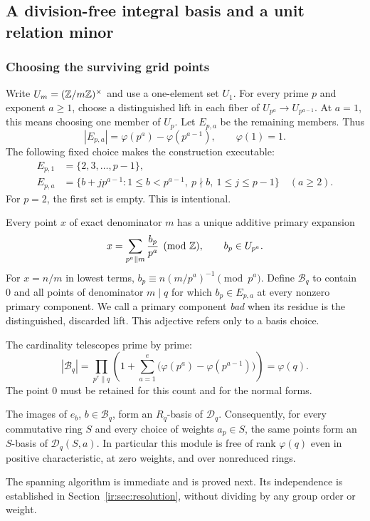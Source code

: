 \subsection{A division-free integral basis and a unit relation minor}
\label{ir:sec:integral}

\subsubsection{Choosing the surviving grid points}
Write $U_m=(\mathbb{Z}/m\mathbb{Z})^\times$ and use a one-element set $U_1$.
For every prime $p$ and exponent $a\ge1$, choose a distinguished lift
in each fiber of $U_{p^a}\to U_{p^{a-1}}$. At $a=1$, this means choosing
one member of $U_p$. Let $E_{p,a}$ be the remaining members. Thus
\begin{equation}\label{ir:eq:local-count}
 |E_{p,a}|=\varphi(p^a)-\varphi(p^{a-1}),\qquad \varphi(1)=1.
\end{equation}
The following fixed choice makes the construction executable:
\begin{align}
 E_{p,1}&=\{2,3,\ldots,p-1\},\label{ir:eq:local-choice}\\
 E_{p,a}&=\{b+jp^{a-1}:1\le b<p^{a-1},\ p\nmid b,
                         \ 1\le j\le p-1\}\quad(a\ge2).\nonumber
\end{align}
For $p=2$, the first set is empty. This is intentional.

Every point $x$ of exact denominator $m$ has a unique additive primary
expansion
\begin{equation}\label{ir:eq:primary-coordinates}
 x=\sum_{p^a\parallel m}\frac{b_p}{p^a}\pmod{\mathbb{Z}},
 \qquad b_p\in U_{p^a}.
\end{equation}
For $x=n/m$ in lowest terms,
$b_p\equiv n(m/p^a)^{-1}\pmod{p^a}$. Define $\mathcal B_q$ to contain $0$
and all points of denominator $m\mid q$ for which
$b_p\in E_{p,a}$ at every nonzero primary component. We call a primary
component \emph{bad} when its residue is the distinguished, discarded
lift. This adjective refers only to a basis choice.

The cardinality telescopes prime by prime:
\begin{equation}\label{ir:eq:basis-count}
 |\mathcal B_q|=
 \prod_{p^e\parallel q}\left(1+
   \sum_{a=1}^{e}\bigl(\varphi(p^a)-\varphi(p^{a-1})\bigr)\right)
 =\varphi(q).
\end{equation}
The point $0$ must be retained for this count and for the normal forms.

\begin{theorem}\label{ir:thm:integral}
The images of $e_b$, $b\in\mathcal B_q$, form an $R_q$-basis of $\mathcal D_q$.
Consequently, for every commutative ring $S$ and every choice of weights
$a_p\in S$, the same points form an $S$-basis of $\mathcal D_q(S,a)$.
In particular this module is free of rank $\varphi(q)$ even in positive
characteristic, at zero weights, and over nonreduced rings.
\end{theorem}
The spanning algorithm is immediate and is proved next. Its independence
is established in Section~\ref{ir:sec:resolution}, without dividing by
any group order or weight.

